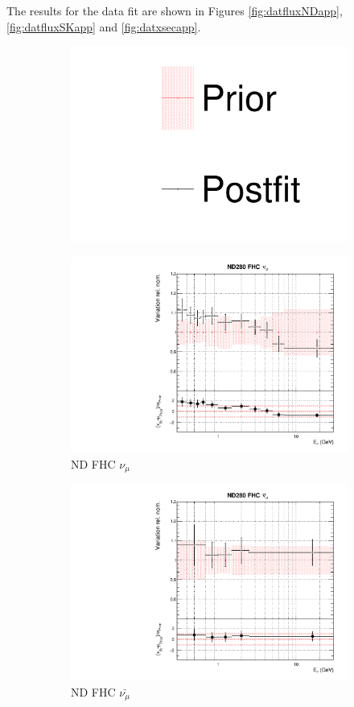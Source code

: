 The results for the data fit are shown in Figures \ref{fig:datfluxNDapp}, \ref{fig:datfluxSKapp} and \ref{fig:datxsecapp}.

\begin{figure}[!htbp]
\centering
\begin{subfigure}{0.8\textwidth}
  \centering
  \includegraphics[width=0.24\linewidth]{figs/dat_leg}
\end{subfigure}
\begin{subfigure}{0.45\textwidth}
  \centering
  \includegraphics[width=0.75\linewidth]{figs/datflux0}
  \caption{ND FHC $\nu_{\mu}$}
\end{subfigure}
\begin{subfigure}{0.45\textwidth}
  \centering
  \includegraphics[width=0.75\linewidth]{figs/datflux1}
  \caption{ND FHC $\bar{\nu_{\mu}}$}
\end{subfigure}
\begin{subfigure}{0.45\textwidth}

\end{subfigure}
\end{figure}
